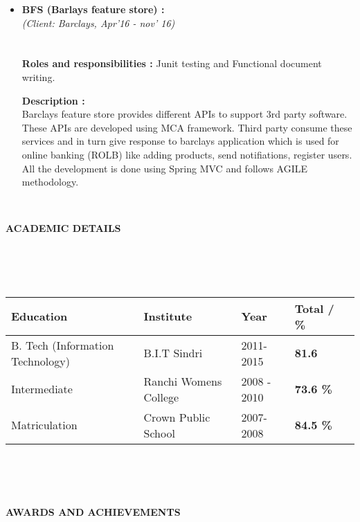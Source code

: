 \documentclass[a4paper,10pt]{article}
\newcommand{\lsep}{-0.5cm}
\newcommand{\resheading}[1]{{\small \colorbox{mygrey}{\begin{minipage}{0.975\textwidth}{\textbf{#1 \vphantom{p\^{E}}}}\end{minipage}}}}
\begin{document}
\begin{itemize}
\item \textbf{BFS (Barlays feature store) :} \\
\emph{(Client: Barclays, Apr'16 - nov' 16)} \\[-0.6cm]\\\\
\textbf {Roles and responsibilities :} Junit testing and Functional document writing.
	
	 \textbf {Description :} \\ Barclays feature store provides different APIs to support 3rd party software. These APIs are developed using MCA framework. Third party consume these services and in turn give response to barclays application which is used for online banking (ROLB) like adding products, send notifiations, register users. All the development is done using Spring MVC and follows AGILE methodology. 

\end{itemize}
\hspace{0.5cm}\\[-0.2cm]
\resheading{\textbf{ACADEMIC DETAILS} }
\\ [\lsep]
\\ \\
\begin{tabular}{ l @{\hskip 0.25in} l @{\hskip 0.25in} l @{\hskip 0.25in} l @{\hskip 0.25in} l }
\hline
\textbf{Education} & \textbf{Institute} & \textbf{Year} & \textbf{Total / \%} \\
\hline
B. Tech (Information Technology) & B.I.T Sindri & 2011-2015 & \textbf{81.6} \\
Intermediate & Ranchi Womens College & 2008 - 2010 & \textbf{73.6 \%}\\
Matriculation  & Crown Public School & 2007-2008 & \textbf{84.5 \%}\\
\hline
\end{tabular}
\\ \hfill \break \\
\hspace{0.5cm}\\[-0.2cm]
\resheading{\textbf{AWARDS AND ACHIEVEMENTS} }\\[\lsep]
\end{document}
